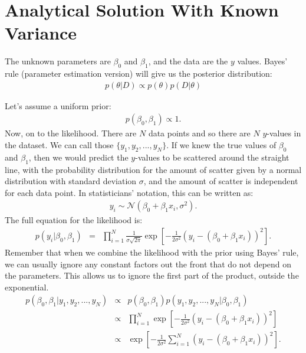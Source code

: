 \section{Analytical Solution With Known Variance}
The unknown parameters are $\beta_0$ and $\beta_1$, and the data are the
$y$ values. Bayes' rule (parameter estimation version) will give us the
posterior distribution:
\begin{eqnarray}
p(\theta|D) \propto p(\theta)p(D|\theta)
\end{eqnarray}

Let's assume a uniform prior:
\begin{eqnarray}
p(\beta_0, \beta_1) \propto 1.
\end{eqnarray}
Now, on to the likelihood. There are $N$ data points and so there are $N$
$y$-values in the dataset. We can call those $\{y_1, y_2, ..., y_N\}$. If we
knew the true values of $\beta_0$ and $\beta_1$, then we would predict the
$y$-values to be scattered around the straight line, with the probability
distribution for the amount of scatter given by a normal distribution with
standard deviation $\sigma$, and the amount of scatter is independent for
each data point. In statisticians' notation, this can be written as:
\begin{eqnarray}
y_i \sim \mathcal{N}(\beta_0 + \beta_1 x_i, \sigma^2).
\end{eqnarray}
The full equation for the likelihood is:
\begin{eqnarray}
p(y_i|\beta_0, \beta_1) &=& \prod_{i=1}^N \frac{1}{\sigma\sqrt{2\pi}}
\exp\left[-\frac{1}{2\sigma^2}\left(y_i - (\beta_0 + \beta_1 x_i)\right)^2\right].
\end{eqnarray}
Remember that when we combine the likelihood with the prior using Bayes' rule,
we can usually ignore any constant factors out the front that do not depend on
the parameters. This allows us to ignore the first part of the product, outside
the exponential.
\begin{eqnarray}
p(\beta_0, \beta_1 | y_1, y_2, ..., y_N) &\propto& p(\beta_0, \beta_1)
p(y_1, y_2, ..., y_N|\beta_0, \beta_1)\\
&\propto& \prod_{i=1}^N \exp\left[-\frac{1}{2\sigma^2}\left(y_i - (\beta_0 + \beta_1 x_i)\right)^2\right]\\
&\propto& \exp\left[-\frac{1}{2\sigma^2}\sum_{i=1}^N\left(y_i - (\beta_0 + \beta_1 x_i)\right)^2\right].
\end{eqnarray}






